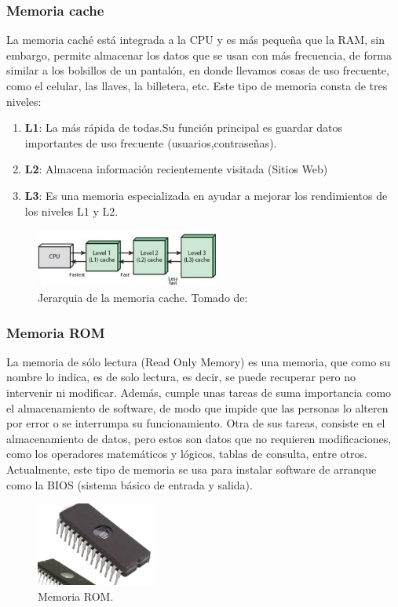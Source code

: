 \documentclass{article}
\begin{document}
\subsubsection{Memoria cache}
La memoria caché está integrada a la CPU y es más pequeña que la RAM, sin embargo, permite almacenar los datos que se usan con más frecuencia, de forma similar a los bolsillos de un pantalón, en donde llevamos cosas de uso frecuente, como el celular, las llaves, la billetera, etc. Este tipo de memoria consta de tres niveles:
\begin{enumerate}
\item \textbf{L1}: La más rápida de todas.Su función principal es guardar datos importantes de uso frecuente (usuarios,contraseñas).
\item \textbf{L2}: Almacena información recientemente visitada (Sitios Web)
\item \textbf{L3}: Es una memoria especializada en ayudar a mejorar los rendimientos de los niveles L1 y L2.
\end{enumerate}

\begin{figure}[h]
\includegraphics[width=6cm]{Cache.PNG}
\centering
\caption{Jerarquia de la memoria cache. \centering Tomado de:\cite{URUGUAYOC}}
\label{Cache.PNG}
\end{figure}
\subsubsection{Memoria ROM}
La memoria de sólo lectura (Read Only Memory) es una memoria, que como su nombre lo indica, es de solo lectura, es decir, se puede recuperar pero no intervenir ni modificar. Además, cumple unas tareas de suma importancia como el almacenamiento de software, de modo que impide que las personas lo alteren por error o se interrumpa su funcionamiento. Otra de sus tareas, consiste en el almacenamiento de datos, pero estos son datos que no requieren modificaciones, como los operadores matemáticos y lógicos, tablas de consulta, entre otros. Actualmente, este tipo de memoria se usa para instalar software de arranque como la BIOS (sistema básico de entrada y salida). 
\begin{figure}[h]
\includegraphics[width=4cm]{ROM.PNG}
\centering
\caption{Memoria ROM.}
\label{ROM.PNG}
\end{figure}
\end{document}
